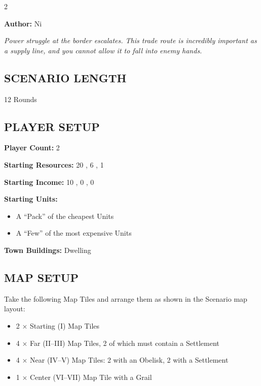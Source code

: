 
\begin{multicols*}{2}

\textbf{Author:} Ni

\textit{Power struggle at the border escalates. This trade route is incredibly important as a supply line, and you cannot allow it to fall into enemy hands.}

\subsection*{\MakeUppercase{Scenario Length}}
12 Rounds

\subsection*{\MakeUppercase{Player Setup}}
\textbf{Player Count:} 2

\textbf{Starting Resources:} 20 , 6 , 1 

\textbf{Starting Income:} 10 , 0 , 0 

\textbf{Starting Units:}

\begin{itemize}
  \item A ``Pack'' of the cheapest  Units
  \item A ``Few'' of the most expensive  Units
\end{itemize}

\textbf{Town Buildings:}  Dwelling

\subsection*{\MakeUppercase{Map Setup}}

Take the following Map Tiles and arrange them as shown in the Scenario map layout:

\begin{itemize}
  \item 2 × Starting (I) Map Tiles
  \item 4 × Far (II--III) Map Tiles, 2 of which must contain a Settlement
  \item 4 × Near (IV--V) Map Tiles: 2 with an Obelisk, 2 with a Settlement
  \item 1 × Center (VI--VII) Map Tile with a Grail
\end{itemize}


\end{multicols*}
